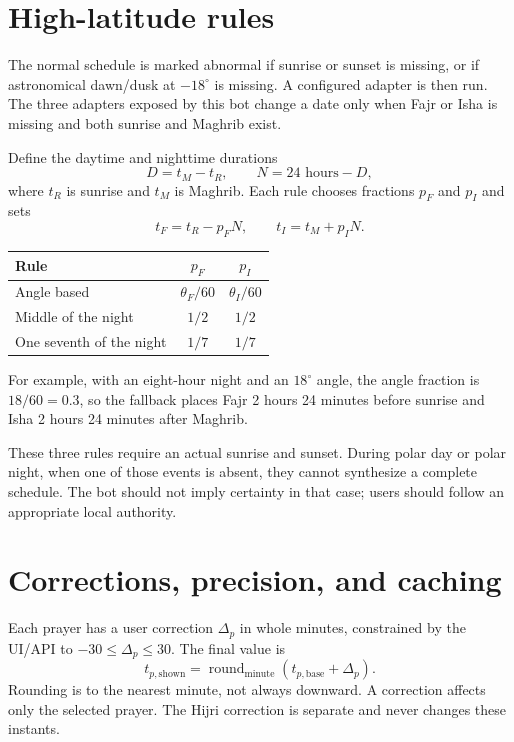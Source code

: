 \documentclass[11pt,a4paper]{article}
\newcommand{\note}[1]{%
  \begin{center}\colorbox{soft}{\parbox{0.92\linewidth}{\small #1}}\end{center}}
\begin{document}
\section{High-latitude rules}\label{sec:highlat}

The normal schedule is marked abnormal if sunrise or sunset is missing, or if astronomical dawn/dusk at $-18^\circ$ is missing. A configured adapter is then run. The three adapters exposed by this bot change a date only when Fajr or Isha is missing and both sunrise and Maghrib exist.

Define the daytime and nighttime durations
\begin{equation}
  D=t_M-t_R,\qquad N=24\text{ hours}-D,
\end{equation}
where $t_R$ is sunrise and $t_M$ is Maghrib. Each rule chooses fractions $p_F$ and $p_I$ and sets
\begin{equation}
  t_F=t_R-p_FN,\qquad t_I=t_M+p_IN.
  \label{eq:highlat}
\end{equation}

\begin{center}
\begin{tabular}{lcc}
\toprule
\textbf{Rule} & $p_F$ & $p_I$ \\
\midrule
Angle based & $\theta_F/60$ & $\theta_I/60$ \\
Middle of the night & $1/2$ & $1/2$ \\
One seventh of the night & $1/7$ & $1/7$ \\
\bottomrule
\end{tabular}
\end{center}

For example, with an eight-hour night and an $18^\circ$ angle, the angle fraction is $18/60=0.3$, so the fallback places Fajr 2 hours 24 minutes before sunrise and Isha 2 hours 24 minutes after Maghrib.

\note{These three rules require an actual sunrise and sunset. During polar day or polar night, when one of those events is absent, they cannot synthesize a complete schedule. The bot should not imply certainty in that case; users should follow an appropriate local authority.}

\section{Corrections, precision, and caching}

Each prayer has a user correction $\Delta_p$ in whole minutes, constrained by the UI/API to $-30\leq\Delta_p\leq30$. The final value is
\begin{equation}
  t_{p,\mathrm{shown}}=\operatorname{round}_{\mathrm{minute}}
  \left(t_{p,\mathrm{base}}+\Delta_p\right).
\end{equation}
Rounding is to the nearest minute, not always downward. A correction affects only the selected prayer. The Hijri correction is separate and never changes these instants.
\end{document}
